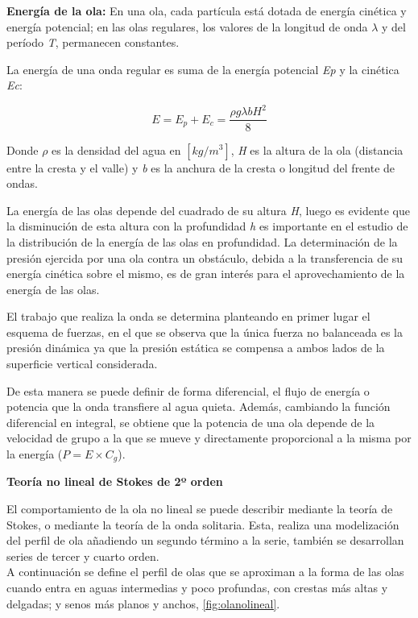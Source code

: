 \textbf{Energía de la ola:} En una ola, cada partícula está dotada de
energía cinética y energía potencial; en las olas regulares, los valores
de la longitud de onda \(\lambda\) y del período \emph{T}, permanecen
constantes.

La energía de una onda regular es suma de la energía potencial \emph{Ep}
y la cinética \emph{Ec}:

\[E=E_p+E_c= \frac {\rho g \lambda b H^2}{8}\]

Donde \(\rho\) es la densidad del agua en \([kg/m^3]\), \emph{H} es la
altura de la ola (distancia entre la cresta y el valle) y \emph{b} es la
anchura de la cresta o longitud del frente de ondas.

La energía de las olas depende del cuadrado de su altura \emph{H}, luego
es evidente que la disminución de esta altura con la profundidad
\emph{h} es importante en el estudio de la distribución de la energía de
las olas en profundidad. La determinación de la presión ejercida por una
ola contra un obstáculo, debida a la transferencia de su energía
cinética sobre el mismo, es de gran interés para el aprovechamiento de
la energía de las olas.

El trabajo que realiza la onda se determina planteando en primer lugar
el esquema de fuerzas, en el que se observa que la única fuerza no
balanceada es la presión dinámica ya que la presión estática se compensa
a ambos lados de la superficie vertical considerada.

De esta manera se puede definir de forma diferencial, el flujo de
energía o potencia que la onda transfiere al agua quieta. Además,
cambiando la función diferencial en integral, se obtiene que la potencia
de una ola depende de la velocidad de grupo a la que se mueve y
directamente proporcional a la misma por la energía
(\(P=E \times C_g\)).

\textbf{Teoría no lineal de Stokes de 2º
orden}

El comportamiento de la ola no lineal se puede describir mediante la
teoría de Stokes, o mediante la teoría de la onda solitaria. Esta,
realiza una modelización del perfil de ola añadiendo un segundo término
a la serie, también se desarrollan series de tercer y cuarto orden.\\

A continuación se define el perfil de olas que se aproximan a la forma
de las olas cuando entra en aguas intermedias y poco profundas, con
crestas más altas y delgadas; y senos más planos y anchos, \autoref{fig:olanolineal}.

